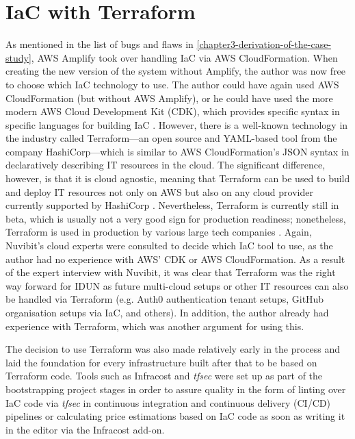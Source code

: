 \section*{IaC with Terraform}
\label{chapter4-iac-with-terraform}

As mentioned in the list of bugs and flaws in \autoref{chapter3-derivation-of-the-case-study}, AWS Amplify took over handling IaC via AWS CloudFormation. When creating the new version of the system without Amplify, the author was now free to choose which IaC technology to use. The author could have again used AWS CloudFormation (but without AWS Amplify), or he could have used the more modern AWS Cloud Development Kit (CDK), which provides specific syntax in specific languages for building IaC \citep{amazon_web_services_inc_aws_nodate}. However, there is a well-known technology in the industry called Terraform—an open source and YAML-based tool from the company HashiCorp—which is similar to AWS CloudFormation’s JSON syntax in declaratively describing IT resources in the cloud. The significant difference, however, is that it is cloud agnostic, meaning that Terraform can be used to build and deploy IT resources not only on AWS but also on any cloud provider currently supported by HashiCorp \citep{hashicorp_browse_nodate}. Nevertheless, Terraform is currently still in beta, which is usually not a very good sign for production readiness; nonetheless, Terraform is used in production by various large tech companies \citep{stackshare_why_nodate}. Again, Nuvibit’s cloud experts were consulted to decide which IaC tool to use, as the author had no experience with AWS’ CDK or AWS CloudFormation. As a result of the expert interview with Nuvibit, it was clear that Terraform was the right way forward for IDUN as future multi-cloud setups or other IT resources can also be handled via Terraform (e.g. Auth0 authentication tenant setups, GitHub organisation setups via IaC, and others). In addition, the author already had experience with Terraform, which was another argument for using this.


The decision to use Terraform was also made relatively early in the process and laid the foundation for every infrastructure built after that to be based on Terraform code. Tools such as Infracost and \textit{tfsec} were set up as part of the bootstrapping project stages in order to assure quality in the form of linting over IaC code via \textit{tfsec} in continuous integration and continuous delivery (CI/CD) pipelines or calculating price estimations based on IaC code as soon as writing it in the editor via the Infracost add-on.

